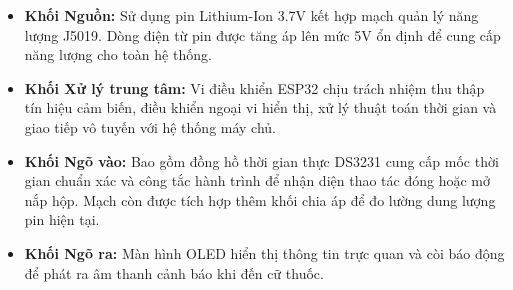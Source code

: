 \documentclass[12pt, a4paper, oneside]{article}
\begin{document}
\begin{itemize}
    \item \textbf{Khối Nguồn:} Sử dụng pin Lithium-Ion 3.7V kết hợp mạch quản lý năng lượng J5019. Dòng điện từ pin được tăng áp lên mức 5V ổn định để cung cấp năng lượng cho toàn hệ thống.
    \item \textbf{Khối Xử lý trung tâm:} Vi điều khiển ESP32 chịu trách nhiệm thu thập tín hiệu cảm biến, điều khiển ngoại vi hiển thị, xử lý thuật toán thời gian và giao tiếp vô tuyến với hệ thống máy chủ.
    \item \textbf{Khối Ngõ vào:} Bao gồm đồng hồ thời gian thực DS3231 cung cấp mốc thời gian chuẩn xác và công tắc hành trình để nhận diện thao tác đóng hoặc mở nắp hộp. Mạch còn được tích hợp thêm khối chia áp để đo lường dung lượng pin hiện tại.
    \item \textbf{Khối Ngõ ra:} Màn hình OLED hiển thị thông tin trực quan và còi báo động để phát ra âm thanh cảnh báo khi đến cữ thuốc.
\end{itemize}
\end{document}

